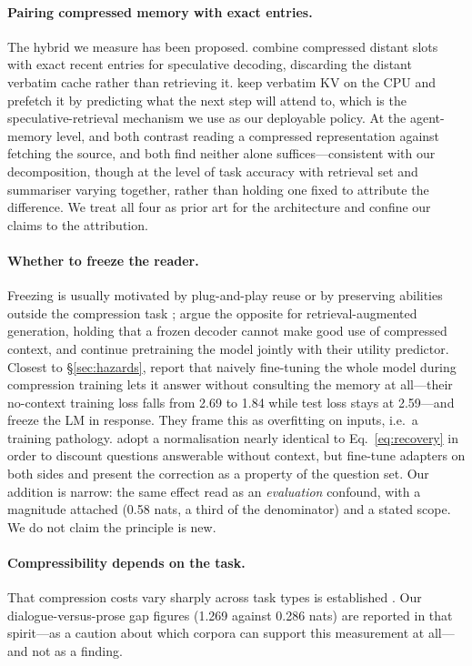 \documentclass[11pt]{article}
\begin{document}
\paragraph{Pairing compressed memory with exact entries.}
The hybrid we measure has been proposed. \citet{strongdrafts} combine compressed
distant slots with exact recent entries for speculative decoding, discarding the
distant verbatim cache rather than retrieving it. \citet{specache} keep verbatim
KV on the CPU and prefetch it by predicting what the next step will attend to,
which is the speculative-retrieval mechanism we use as our deployable policy. At
the agent-memory level, \citet{justmem} and \citet{infinimemory} both contrast
reading a compressed representation against fetching the source, and both find
neither alone suffices---consistent with our decomposition, though at the level
of task accuracy with retrieval set and summariser varying together, rather than
holding one fixed to attribute the difference. We treat all four as prior art for
the architecture and confine our claims to the attribution.

\paragraph{Whether to freeze the reader.}
Freezing is usually motivated by plug-and-play reuse or by preserving abilities
outside the compression task \citep{icae,arcencoder,500x}; \citet{cocom} argue the
opposite for retrieval-augmented generation, holding that a frozen decoder cannot
make good use of compressed context, and \citet{spkv} continue pretraining the
model jointly with their utility predictor. Closest to \S\ref{sec:hazards},
\citet{ccm} report that naively fine-tuning the whole model during compression
training lets it answer without consulting the memory at all---their no-context
training loss falls from 2.69 to 1.84 while test loss stays at 2.59---and freeze
the LM in response. They frame this as overfitting on inputs, i.e.\ a training
pathology. \citet{simplecc} adopt a normalisation nearly identical to
Eq.~\ref{eq:recovery} in order to discount questions answerable without context,
but fine-tune adapters on both sides and present the correction as a property of
the question set. Our addition is narrow: the same effect read as an
\emph{evaluation} confound, with a magnitude attached (0.58 nats, a third of the
denominator) and a stated scope. We do not claim the principle is new.

\paragraph{Compressibility depends on the task.}
That compression costs vary sharply across task types is established
\citep{kvbench,shotkv}. Our dialogue-versus-prose gap figures (1.269 against 0.286
nats) are reported in that spirit---as a caution about which corpora can support
this measurement at all---and not as a finding.
\end{document}
